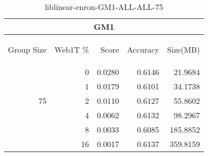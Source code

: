 \begin{center}
\begin{table}[htbp]
\begin{tabular}{ | r | r | r | r | r |}
\hline
\multicolumn{5}{|c|}{GM1}\\
\hline
\begin{sideways}Group Size\end{sideways} & \begin{sideways}Web1T \%\end{sideways} & \begin{sideways}Score\end{sideways} & \begin{sideways}Accuracy\end{sideways} & \begin{sideways}Size(MB)\end{sideways}\\
\hline
\multirow{5}{*}{75}
 & 0 & 0.0280 & 0.6146 & 21.9684\\ \cline{2-5}
 & 1 & 0.0179 & 0.6101 & 34.1738\\ \cline{2-5}
 & 2 & 0.0110 & 0.6127 & 55.8602\\ \cline{2-5}
 & 4 & 0.0062 & 0.6132 & 98.2967\\ \cline{2-5}
 & 8 & 0.0033 & 0.6085 & 185.8852\\ \cline{2-5}
 & 16 & 0.0017 & 0.6137 & 359.8159\\ \cline{2-5}
\hline
\end{tabular}
\caption{liblinear-enron-GM1-ALL-ALL-75}
\label{table:liblinear-enron-GM1-ALL-ALL-75}
\end{table}
\end{center}

